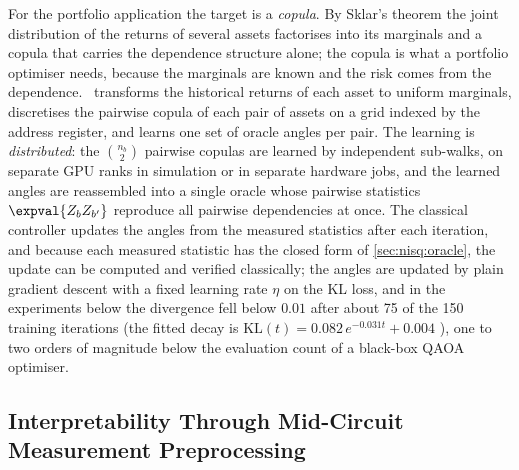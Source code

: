 For the portfolio application the target is a \emph{copula}. By Sklar's theorem \cite{sklar1959copula} the joint distribution of the returns of several assets factorises into its marginals and a copula that carries the dependence structure alone; the copula is what a portfolio optimiser needs, because the marginals are known and the risk comes from the dependence. \qawa\ transforms the historical returns of each asset to uniform marginals, discretises the pairwise copula of each pair of assets on a grid indexed by the address register, and learns one set of oracle angles per pair. The learning is \emph{distributed}: the $\binom{n_{b}}{2}$ pairwise copulas are learned by independent sub-walks, on separate GPU ranks in simulation or in separate hardware jobs, and the learned angles are reassembled into a single oracle whose pairwise statistics $\expval{Z_{b}Z_{b'}}$ reproduce all pairwise dependencies at once. The classical controller updates the angles from the measured statistics after each iteration, and because each measured statistic has the closed form of \cref{sec:nisq:oracle}, the update can be computed and verified classically; the angles are updated by plain gradient descent with a fixed learning rate $\eta$ on the KL loss, and in the experiments below the divergence fell below $0.01$ after about 75 of the 150 training iterations (the fitted decay is $\mathrm{KL}(t)=0.082\,e^{-0.031t}+0.004$ \cite{guo2025qawa}), one to two orders of magnitude below the evaluation count of a black-box QAOA optimiser.

\subsection{Interpretability Through Mid-Circuit Measurement Preprocessing}\label{sec:nisq:interp}

